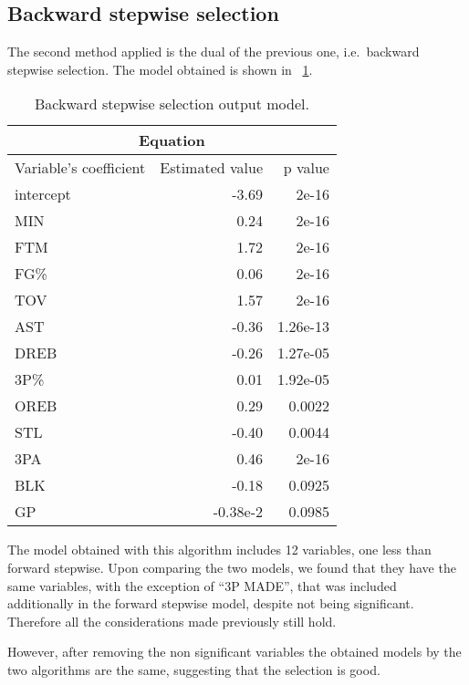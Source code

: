 \subsection{Backward stepwise selection}

The second method applied is the dual of the previous one, i.e.\ backward stepwise selection. The model obtained is shown in \Tab~\ref{table:BackwardModelSummary}.

\begin{table}[H]
	\centering
	\begin{tabular}{|| l | r | r ||} 
		\hline
		\multicolumn{3}{|c|}{Equation} \\
		\hline
		Variable's coefficient & Estimated value & p value \\
		\hline
		intercept & -3.69 & 2e-16 \\
		MIN & 0.24 & 2e-16 \\
		FTM & 1.72 & 2e-16 \\
		FG\% & 0.06 & 2e-16 \\
		TOV & 1.57 & 2e-16 \\
		AST & -0.36 & 1.26e-13 \\
		DREB & -0.26 & 1.27e-05 \\
		3P\% & 0.01 & 1.92e-05 \\
		OREB & 0.29 & 0.0022 \\
		STL & -0.40 & 0.0044 \\
		3PA & 0.46 & 2e-16 \\
		BLK & -0.18 & 0.0925 \\
		GP & -0.38e-2 & 0.0985 \\
		\hline
	\end{tabular}
	\caption{Backward stepwise selection output model.}
	\label{table:BackwardModelSummary}
\end{table}

The model obtained with this algorithm includes 12 variables, one less than forward stepwise. Upon comparing the two models, we found that they have the same variables, with the exception of ``3P MADE'', that was included additionally in the forward stepwise model, despite not being significant.
Therefore all the considerations made previously still hold.

However, after removing the non significant variables the obtained models by the two algorithms are the same, suggesting that the selection is good.